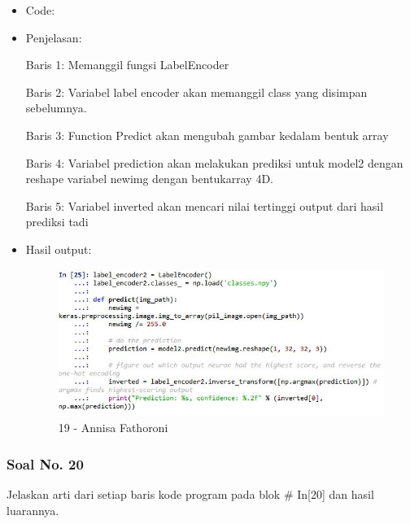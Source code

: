 \begin{itemize}
\item Code:


\item Penjelasan:

Baris 1: Memanggil fungsi LabelEncoder

Baris 2: Variabel label encoder akan memanggil class yang disimpan sebelumnya.

Baris 3: Function Predict akan mengubah gambar kedalam bentuk array

Baris 4: Variabel prediction akan melakukan prediksi untuk model2 dengan reshape variabel newimg dengan bentukarray 4D.

Baris 5: Variabel inverted akan mencari nilai tertinggi output dari hasil prediksi tadi

\item Hasil output:

\begin{figure}[!hbtp]
\centering
\includegraphics[scale=0.7]{figures/Chapter 7/1164067/Praktek/Chapter7AnnisaFathoroni19.jpg}
\caption{19 - Annisa Fathoroni}
\label{19 - Annisa Fathoroni}
\end{figure}

\end{itemize}

\subsubsection{Soal No. 20}
Jelaskan arti dari setiap baris kode program pada blok \# In[20] dan hasil luarannya.

